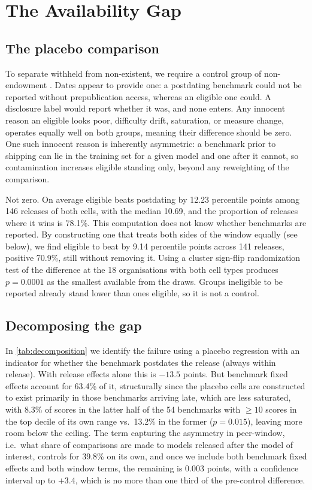 \documentclass{article}
\begin{document}
\section{The Availability Gap}\label{sec:core}

\subsection{The placebo comparison}\label{sec:core-placebo}

To separate withheld from non-existent, we require a control group of non-endowment \citep{dye1985}. Dates appear to provide one: a postdating benchmark could not be reported without prepublication access, whereas an eligible one could. A disclosure label would report whether it was, and none enters. Any innocent reason an eligible looks poor, difficulty drift, saturation, or measure change, operates equally well on both groups, meaning their difference should be zero. One such innocent reason is inherently asymmetric: a benchmark prior to shipping can lie in the training set for a given model and one after it cannot, so contamination increases eligible standing only, beyond any reweighting of the comparison.

Not zero. On average eligible beats postdating by 12.23 percentile points among 146 releases of both cells, with the median 10.69, and the proportion of releases where it wins is 78.1\%. This computation does not know whether benchmarks are reported. By constructing one that treats both sides of the window equally (see below), we find eligible to beat by 9.14 percentile points across 141 releases, positive 70.9\%, still without removing it. Using a cluster sign-flip randomization test of the difference at the 18 organisations with both cell types produces $p = 0.0001$ as the smallest available from the draws. Groups ineligible to be reported already stand lower than ones eligible, so it is not a control.

\subsection{Decomposing the gap}\label{sec:core-boundary}

In \autoref{tab:decomposition} we identify the failure using a placebo regression with an indicator for whether the benchmark postdates the release (always within release). With release effects alone this is $-13.5$ points. But benchmark fixed effects account for 63.4\% of it, structurally since the placebo cells are constructed to exist primarily in those benchmarks arriving late, which are less saturated, with 8.3\% of scores in the latter half of the 54 benchmarks with $\geq 10$ scores in the top decile of its own range vs.\ 13.2\% in the former ($p = 0.015$), leaving more room below the ceiling. The term capturing the asymmetry in peer-window, i.e.\ what share of comparisons are made to models released after the model of interest, controls for 39.8\% on its own, and once we include both benchmark fixed effects and both window terms, the remaining is 0.003 points, with a confidence interval up to $+3.4$, which is no more than one third of the pre-control difference.
\end{document}
